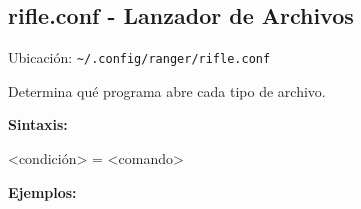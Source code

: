 \documentclass[
  doc,
  floatsintext,
  longtable,
  a4paper,
  nolmodern,
  notxfonts,
  notimes,
  12pt,
  colorlinks=true,linkcolor=blue,citecolor=blue,urlcolor=blue]{apa7}
\newenvironment{Shaded}{\begin{snugshade}}{\end{snugshade}}
\newcommand{\NormalTok}[1]{\textcolor[rgb]{0.00,0.23,0.31}{#1}}
\newcommand{\OperatorTok}[1]{\textcolor[rgb]{0.37,0.37,0.37}{#1}}
\begin{document}
\subsection{rifle.conf - Lanzador de
Archivos}\label{rifle.conf---lanzador-de-archivos}

Ubicación: \texttt{\textasciitilde{}/.config/ranger/rifle.conf}

Determina qué programa abre cada tipo de archivo.

\textbf{Sintaxis:}

\begin{Shaded}
\begin{Highlighting}[]
\OperatorTok{\textless{}}\NormalTok{condición}\OperatorTok{\textgreater{}}\NormalTok{ = }\OperatorTok{\textless{}}\NormalTok{comando}\OperatorTok{\textgreater{}}
\end{Highlighting}
\end{Shaded}

\textbf{Ejemplos:}
\end{document}
